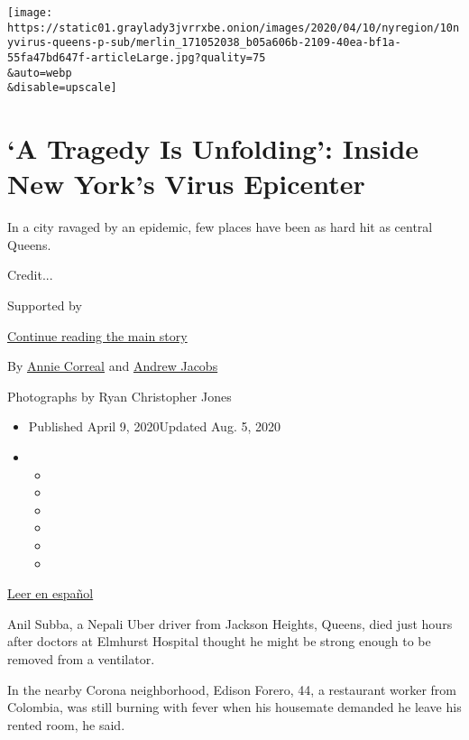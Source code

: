 \texttt{[image: https://static01.graylady3jvrrxbe.onion/images/2020/04/10/nyregion/10nyvirus-queens-p-sub/merlin\_171052038\_b05a606b-2109-40ea-bf1a-55fa47bd647f-articleLarge.jpg?quality=75\\\&auto=webp\\\&disable=upscale]}

\hypertarget{a-tragedy-is-unfolding-inside-new-yorks-virus-epicenter}{%
\section{`A Tragedy Is Unfolding': Inside New York's Virus
Epicenter}\label{a-tragedy-is-unfolding-inside-new-yorks-virus-epicenter}}

In a city ravaged by an epidemic, few places have been as hard hit as
central Queens.

Credit...

Supported by

\protect\hyperlink{after-sponsor}{Continue reading the main story}

By \href{https://www.nytimes3xbfgragh.onion/by/annie-correal}{Annie
Correal} and
\href{https://www.nytimes3xbfgragh.onion/by/andrew-jacobs}{Andrew
Jacobs}

Photographs by Ryan Christopher Jones

\begin{itemize}
\item
  Published April 9, 2020Updated Aug. 5, 2020
\item
  \begin{itemize}
  \item
  \item
  \item
  \item
  \item
  \item
  \end{itemize}
\end{itemize}

\href{https://www.nytimes3xbfgragh.onion/es/2020/04/10/espanol/mundo/coronavirus-queens-hospital-elmhurst-corona-jackson-heights.html}{Leer
en español}

Anil Subba, a Nepali Uber driver from Jackson Heights, Queens, died just
hours after doctors at Elmhurst Hospital thought he might be strong
enough to be removed from a ventilator.

In the nearby Corona neighborhood, Edison Forero, 44, a restaurant
worker from Colombia, was still burning with fever when his housemate
demanded he leave his rented room, he said.

